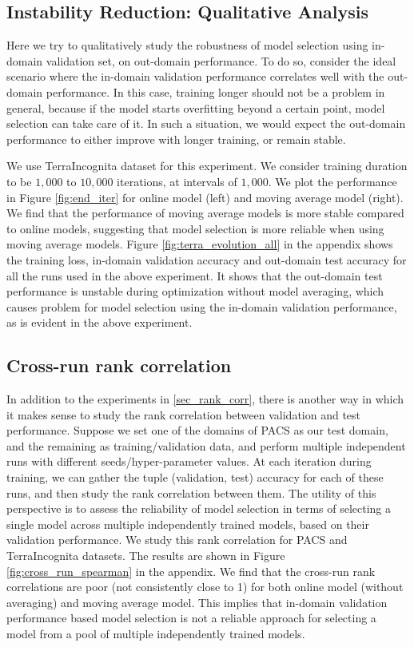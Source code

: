 \subsection{Instability Reduction: Qualitative Analysis}
\label{sec_qualitative_analysis}
Here we try to qualitatively study the robustness of  model selection using in-domain validation set, on out-domain performance. To do so, consider the ideal scenario where the in-domain validation performance correlates well with the out-domain performance. In this case, training longer should not be a problem in general, because if the model starts overfitting beyond a certain point, model selection can take care of it. In such a situation, we would expect the out-domain performance to either improve with longer training, or remain stable.

We use TerraIncognita dataset for this experiment. We consider training duration to be $1,000$ to $10,000$ iterations, at intervals of $1,000$. We plot the performance in Figure \ref{fig:end_iter} for online model (left) and moving average model (right). We find that the performance of moving average models is more stable compared to online models, suggesting that model selection is more reliable when using moving average models. Figure \ref{fig:terra_evolution_all} in the appendix shows the training loss, in-domain validation accuracy and out-domain test accuracy for all the runs used in the above experiment. It shows that the out-domain test performance is unstable during optimization without model averaging, which causes problem for model selection using the in-domain validation performance, as is evident in the above experiment. 

\subsection{Cross-run rank correlation}
\label{sec_cross_run_rank_corr}
In addition to the experiments in \ref{sec_rank_corr}, there is another way in which it makes sense to study the rank correlation between validation and test performance. Suppose we set one of the domains of PACS as our test domain, and the remaining as training/validation data, and perform multiple independent runs with different seeds/hyper-parameter values. At each iteration during training, we can gather the tuple (validation, test) accuracy for each of these runs, and then study the rank correlation between them. The utility of this perspective is to assess the reliability of model selection in terms of selecting a single model across multiple independently trained models, based on their validation performance. We study this rank correlation for PACS and TerraIncognita datasets. The results are shown in Figure \ref{fig:cross_run_spearman} in the appendix. We find that the cross-run rank correlations are poor (not consistently close to 1) for both online model (without averaging) and moving average model. This implies that in-domain validation performance based model selection is not a reliable approach for selecting a model from a pool of multiple independently trained models.

